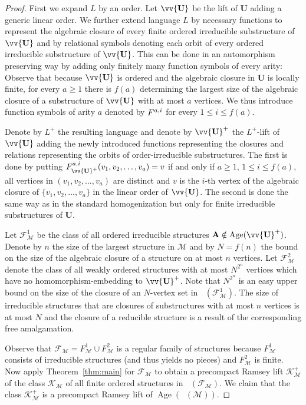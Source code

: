 \documentclass{elsarticle}
\def\Forb{\mathop{\mathrm{Forb_{he}}}\nolimits}
\def\Forbm{\mathop{\mathrm{Forb_m}}\nolimits}
\def\Age{\mathop{\mathrm{Age}}\nolimits}
\def\str#1{\mathbf {#1}}
\def\func#1#2{\nbfunc{\ifstrempty{#1}{}{\str{#1}}}{#2}}
\def\nbfunc#1#2{F\ifstrempty{#1}{}{_{#1}}\ifstrempty{#2}{}{^{#2}}}
\def\F{{\mathcal F}}
\theoremstyle{plain}
\theoremstyle{definition}
\theoremstyle{remark}
\begin{document}
\begin{proof}
First we expand $L$ by an order. Let $\vv{\str{U}}$ be
the lift of $\str U$ adding a generic linear order.
We further extend language $L$ by necessary functions to represent the
algebraic closure of every finite ordered irreducible substructure of $\vv{\str{U}}$
and by relational symbols denoting each orbit of every ordered irreducible substructure of $\vv{\str{U}}$.
This can be done in an automorphism preserving way by adding only finitely many function symbols of every arity:
Observe that because $\vv{\str{U}}$ is ordered and the algebraic closure in $\str{U}$ is locally finite, for every
$a\geq 1$ there is $f(a)$ determining the largest size of the algebraic closure of a substructure of $\vv{\str{U}}$
with at most $a$ vertices. We thus introduce function symbols of arity $a$ denoted by $\func{}{a,i}$ for every $1\leq i\leq f(a)$.

 Denote by $L^+$ the resulting language and denote by $\vv{\str{U}}^+$ the
$L^+$-lift of $\vv{\str{U}}$ adding the newly introduced functions representing the closures and relations representing the orbits of order-irreducible substructures.
The first is done by putting $\nbfunc{\vv{\str{U}}^+}{a,i}(v_1,v_2,\ldots, v_a)=v$ if and only if $a\geq 1$, $1\leq i\leq f(a)$, all vertices in $(v_1,v_2,\ldots, v_a)$ are distinct and $v$ is the $i$-th vertex of the algebraic closure of $\{v_1,v_2,\ldots, v_a\}$ in the linear order of $\vv{\str{U}}$.
The second is done the same way as in the standard homogenization but only for finite irreducible substructures of $\str{U}$.

Let $\mathcal F^1_\mathcal M$ be the class of all ordered irreducible structures $\str{A}\notin \Age(\vv{\str{U}}^+)$.
Denote by $n$ the size of the largest structure in $\mathcal M$ and by $N=f(n)$ the bound on the size of the algebraic closure of a structure on at most $n$ vertices. 
Let $\F^2_\mathcal M$ denote the class of all weakly ordered structures with at most $N^{2^n}$ vertices
which have no homomorphism-embedding to $\vv{\str{U}}^+$.
Note that $N^{2^n}$ is an easy upper bound on the size of the closure of an $N$-vertex set in $\Forb(\F^1_\mathcal M)$.
The size of irreducible structures that are closures of substructures with at most $n$ vertices is at most $N$ and the closure of a reducible structure
is a result of the corresponding free amalgamation.

Observe that $\mathcal F_\mathcal M=F^1_\mathcal M\cup F^2_\mathcal M$ is a regular family of structures because $F^1_\mathcal M$ consists of irreducible structures (and
thus yields no pieces) and $F^2_\mathcal M$  is finite.
Now apply Theorem~\ref{thm:main} for $\mathcal F_\mathcal M$
to obtain a precompact Ramsey lift $\mathcal K^+_\mathcal M$ of the class $\mathcal K_\mathcal M$ of all finite ordered structures in $\Forb(\mathcal F_\mathcal M)$.
We claim that  the class  $\mathcal K^+_\mathcal M$ is a precompact Ramsey lift of $\Age(\Forbm(\mathcal M))$.


\end{proof}
\end{document}
